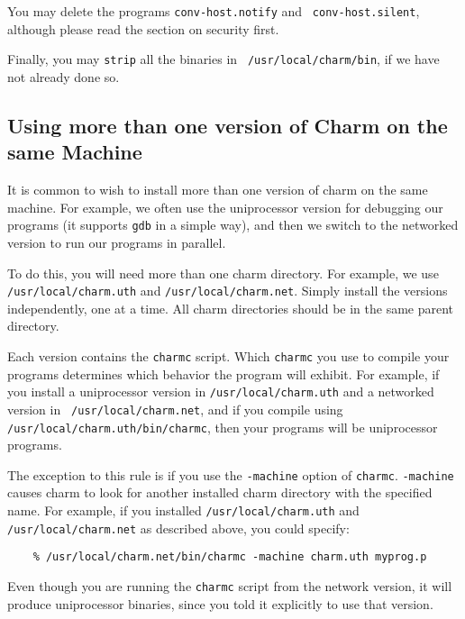 You may delete the programs {\tt conv-host.notify} and {\tt
conv-host.silent}, although please read the section on security first.

Finally, you may {\tt strip} all the binaries in {\tt
/usr/local/charm/bin}, if we have not already done so.

\subsection{Using more than one version of Charm on the same Machine}

It is common to wish to install more than one version of charm on the
same machine.  For example, we often use the uniprocessor version for
debugging our programs (it supports {\tt gdb} in a simple way), and
then we switch to the networked version to run our programs in
parallel.

To do this, you will need more than one charm directory.  For example,
we use {\tt /usr/local/charm.uth} and {\tt /usr/local/charm.net}.
Simply install the versions independently, one at a time.  All charm
directories should be in the same parent directory.

Each version contains the {\tt charmc} script.  Which {\tt charmc} you
use to compile your programs determines which behavior the program
will exhibit.  For example, if you install a uniprocessor version in
{\tt /usr/local/charm.uth} and a networked version in {\tt
/usr/local/charm.net}, and if you compile using {\tt
/usr/local/charm.uth/bin/charmc}, then your programs will be
uniprocessor programs.

The exception to this rule is if you use the {\tt -machine} option of
{\tt charmc}.  {\tt -machine} causes charm to look for another
installed charm directory with the specified name.  For example, if
you installed {\tt /usr/local/charm.uth} and {\tt
/usr/local/charm.net} as described above, you could specify:

\begin{verbatim}
    % /usr/local/charm.net/bin/charmc -machine charm.uth myprog.p
\end{verbatim}

Even though you are running the {\tt charmc} script from the network
version, it will produce uniprocessor binaries, since you told it
explicitly to use that version.



